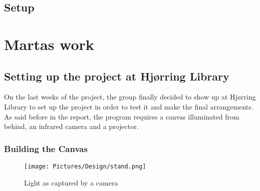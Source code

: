 \section{Setup}
\chapter{Martas work}

\section{Setting up the project at Hj{\o}rring Library}
On the last weeks of the project, the group finally decided to show up at Hj{\o}rring Library to set up the project in order to test it and make the final arrangements. As said before in the report, the program requires a canvas illuminated from behind, an infrared camera and a projector.
\subsection{Building the Canvas}

\begin{figure}[htbp] 
\centering 
\texttt{[image: Pictures/Design/stand.png]} 
\caption{Light as captured by a camera} 
\label{fig:standPosition} 
\end{figure}



